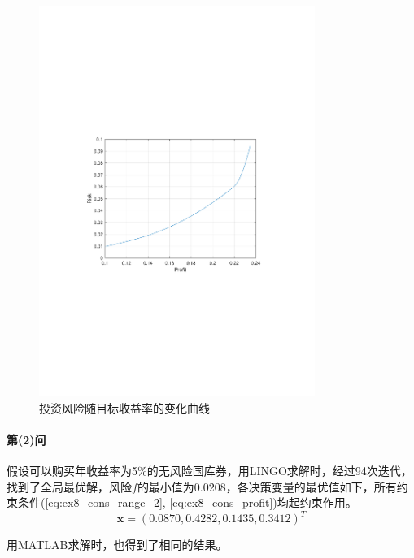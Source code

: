 \documentclass[12pt,a4paper]{article}
\begin{document}
\begin{figure}[H]
    \centering
    \includegraphics[width=0.8\textwidth,trim={3.09cm 9.295cm 3.09cm 9.295cm},clip]{fig/ex8_risk.pdf}
    \caption{投资风险随目标收益率的变化曲线}
    \label{fig:ex8_risk}
\end{figure}

\paragraph{第(2)问} 假设可以购买年收益率为5\%的无风险国库券，用LINGO求解时，经过94次迭代，找到了全局最优解，风险$f$的最小值为0.0208，各决策变量的最优值如下，所有约束条件(\ref{eq:ex8_cons_range_2}, \ref{eq:ex8_cons_profit})均起约束作用。
\begin{equation}
    \boldsymbol{x} = (0.0870, 0.4282, 0.1435, 0.3412)^T
\end{equation}

用MATLAB求解时，也得到了相同的结果。
\end{document}
